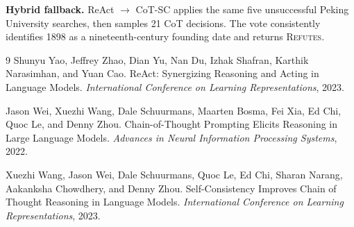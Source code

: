 \documentclass[10pt]{article}
\begin{document}
\textbf{Hybrid fallback.} ReAct $\rightarrow$ CoT-SC applies the same five unsuccessful Peking University searches, then samples 21 CoT decisions. The vote consistently identifies 1898 as a nineteenth-century founding date and returns \textsc{Refutes}.

\begin{thebibliography}{9}
Shunyu Yao, Jeffrey Zhao, Dian Yu, Nan Du, Izhak Shafran, Karthik Narasimhan, and Yuan Cao.
\newblock ReAct: Synergizing Reasoning and Acting in Language Models.
\newblock \emph{International Conference on Learning Representations}, 2023.

Jason Wei, Xuezhi Wang, Dale Schuurmans, Maarten Bosma, Fei Xia, Ed Chi, Quoc Le, and Denny Zhou.
\newblock Chain-of-Thought Prompting Elicits Reasoning in Large Language Models.
\newblock \emph{Advances in Neural Information Processing Systems}, 2022.

Xuezhi Wang, Jason Wei, Dale Schuurmans, Quoc Le, Ed Chi, Sharan Narang, Aakanksha Chowdhery, and Denny Zhou.
\newblock Self-Consistency Improves Chain of Thought Reasoning in Language Models.
\newblock \emph{International Conference on Learning Representations}, 2023.
\end{thebibliography}
\end{document}
